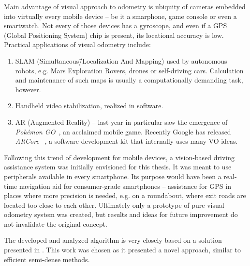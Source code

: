 Main advantage of visual approach to odometry is ubiquity of cameras embedded into virtually every mobile device -- be it a smarphone, game console or even a smartwatch. Not every of those devices has a gyroscope, and even if a GPS (Global Positioning System) chip is present, its locational accuracy is low. Practical applications of visual odometry include:
\begin{enumerate}
	\itemsep0em
	\item SLAM (Simultaneous\=/Localization And Mapping) used by autonomous robots, e.g. Mars Exploration Rovers, drones or self-driving cars. Calculation and maintenance of such maps is usually a computationally demanding task, however.
	
	\item Handheld video stabilization, realized in software.
	
	\item AR (Augmented Reality) -- last year in particular saw the emergence of \textit{Pok\'emon GO}~\cite{pineco}, an acclaimed mobile game. Recently Google has released \textit{ARCore}~\cite{androidvr} , a software development kit that internally uses many VO ideas.
\end{enumerate}


Following this trend of development for mobile devices, a vision-based driving assistance system was initially envisioned for this thesis. It was meant to use peripherals available in every smartphone. Its purpose would have been a real-time navigation aid for consumer-grade smartphones -- assistance for GPS in places where more precision is needed, e.g. on a roundabout, where exit roads are located too close to each other. Ultimately only a prototype of pure visual odometry system was created, but results and ideas for future improvement do not invalidate the original concept.

The developed and analyzed algorithm is very closely based on a solution presented in \cite{jose2015realtime}. This work was chosen as it presented a novel approach, similar to efficient semi-dense methods.

